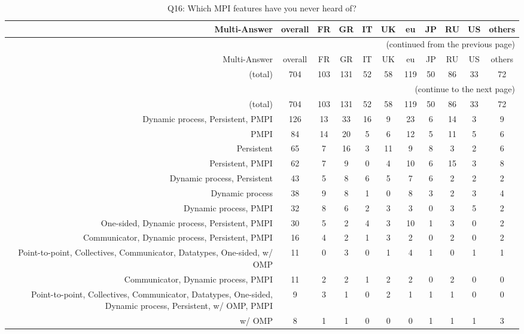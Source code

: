 \clearpage%
{\footnotesize\begin{landscape}%
\begin{longtable}[htb]{r|c|c|c|c|c|c|c|c|c|c}%
\caption{Q16: Which MPI features have you never heard of?}%
\label{tab:Q16-mans} \\%
\hline%
Multi-Answer & overall & FR & GR & IT & UK & eu & JP & RU & US & others \\
 \hline%
\endfirsthead%
\multicolumn{11}{r}{(continued from the previous page)}\\%
\hline%
Multi-Answer & overall & FR & GR & IT & UK & eu & JP & RU & US & others \\
 \hline%
\endhead%
\hline%
(total) & 704 & 103 & 131 & 52 & 58 & 119 & 50 & 86 & 33 & 72 \\%
\hline%
\multicolumn{11}{r}{(continue to the next page)}\\%
\endfoot%
\hline%
(total) & 704 & 103 & 131 & 52 & 58 & 119 & 50 & 86 & 33 & 72 \\%
\hline%
\endlastfoot%
\hline%
{Dynamic process, Persistent, PMPI} & 126 & 13 & 33 & 16 & 9 & 23 & 6 & 14 & 3 & 9 \\%
{PMPI} & 84 & 14 & 20 & 5 & 6 & 12 & 5 & 11 & 5 & 6 \\%
{Persistent} & 65 & 7 & 16 & 3 & 11 & 9 & 8 & 3 & 2 & 6 \\%
{Persistent, PMPI} & 62 & 7 & 9 & 0 & 4 & 10 & 6 & 15 & 3 & 8 \\%
{Dynamic process, Persistent} & 43 & 5 & 8 & 6 & 5 & 7 & 6 & 2 & 2 & 2 \\%
{Dynamic process} & 38 & 9 & 8 & 1 & 0 & 8 & 3 & 2 & 3 & 4 \\%
{Dynamic process, PMPI} & 32 & 8 & 6 & 2 & 3 & 3 & 0 & 3 & 5 & 2 \\%
{One-sided, Dynamic process, Persistent, PMPI} & 30 & 5 & 2 & 4 & 3 & 10 & 1 & 3 & 0 & 2 \\%
{Communicator, Dynamic process, Persistent, PMPI} & 16 & 4 & 2 & 1 & 3 & 2 & 0 & 2 & 0 & 2 \\%
{Point-to-point, Collectives, Communicator, Datatypes, One-sided, w/ OMP} & 11 & 0 & 3 & 0 & 1 & 4 & 1 & 0 & 1 & 1 \\%
{Communicator, Dynamic process, PMPI} & 11 & 2 & 2 & 1 & 2 & 2 & 0 & 2 & 0 & 0 \\%
{Point-to-point, Collectives, Communicator, Datatypes, One-sided, Dynamic process, Persistent, w/ OMP, PMPI} & 9 & 3 & 1 & 0 & 2 & 1 & 1 & 1 & 0 & 0 \\%
{w/ OMP} & 8 & 1 & 1 & 0 & 0 & 0 & 1 & 1 & 1 & 3 \\%

\end{longtable}
\end{landscape}}
